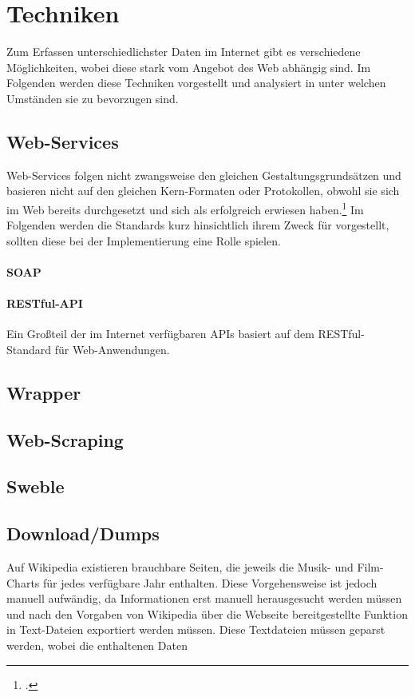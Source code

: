 \section{Techniken}
Zum Erfassen unterschiedlichster Daten im Internet gibt es verschiedene Möglichkeiten, wobei diese stark vom Angebot des Web abhängig sind. Im Folgenden werden diese Techniken vorgestellt und analysiert in unter welchen Umständen sie zu bevorzugen sind.

\subsection{Web-Services}
Web-Services folgen nicht zwangsweise den gleichen Gestaltungsgrundsätzen und basieren nicht auf den gleichen Kern-Formaten oder Protokollen, obwohl sie sich im Web bereits durchgesetzt und sich als erfolgreich erwiesen haben.\footcite[Vgl. Seite 67][]{Fensel2011} Im Folgenden werden die Standards kurz hinsichtlich ihrem Zweck für \arbeitstitel vorgestellt, sollten diese bei der Implementierung eine Rolle spielen.

\paragraph{SOAP}

\paragraph{RESTful-API}
Ein Großteil der im Internet verfügbaren APIs basiert auf dem RESTful-Standard für Web-Anwendungen.


\subsection{Wrapper}
\subsection{Web-Scraping}
\subsection{Sweble}
\subsection{Download/Dumps}
Auf Wikipedia existieren brauchbare Seiten, die jeweils die Musik- und Film-Charts für jedes verfügbare Jahr enthalten. Diese Vorgehensweise ist jedoch manuell aufwändig, da Informationen erst manuell herausgesucht werden müssen und nach den Vorgaben von Wikipedia über die Webseite bereitgestellte Funktion in Text-Dateien exportiert werden müssen. Diese Textdateien müssen geparst werden, wobei die enthaltenen Daten 

